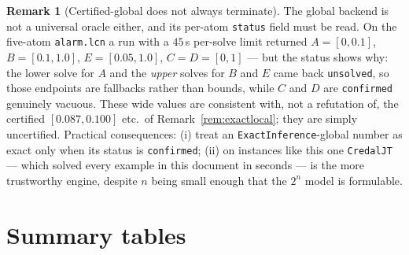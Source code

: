 \documentclass[11pt]{article}
\theoremstyle{definition}
\newtheorem{remark}{Remark}
\begin{document}
\begin{remark}[Certified-global does not always terminate]\label{rem:alarmunsolved}
The global backend is not a universal oracle either, and its per-atom \texttt{status} field must be
read. On the five-atom \texttt{alarm.lcn} a run with a $45$\,s per-solve limit returned
$A=[0,0.1]$, $B=[0.1,1.0]$, $E=[0.05,1.0]$, $C=D=[0,1]$ --- but the status shows why: the lower solve
for $A$ and the \emph{upper} solves for $B$ and $E$ came back \texttt{unsolved}, so those endpoints are
fallbacks rather than bounds, while $C$ and $D$ are \texttt{confirmed} genuinely vacuous. These wide
values are consistent with, not a refutation of, the certified $[0.087,0.100]$ etc.\ of
Remark~\ref{rem:exactlocal}; they are simply uncertified. Practical consequences: (i) treat an
\texttt{ExactInference}-global number as exact only when its status is \texttt{confirmed}; (ii) on
instances like this one \texttt{CredalJT} --- which solved every example in this document in seconds
--- is the more trustworthy engine, despite $n$ being small enough that the $2^n$ model is
formulable.
\end{remark}

\section{Summary tables}\label{sec:tables}
\end{document}
